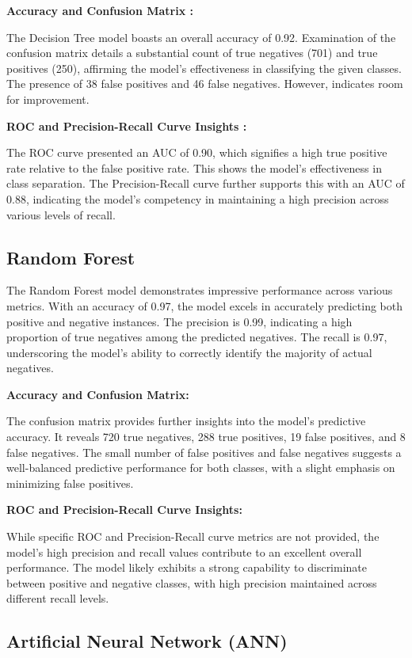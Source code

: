\documentclass[conference]{IEEEtran}
\begin{document}
\textbf{Accuracy and Confusion Matrix :}

The Decision Tree model boasts an overall accuracy of 0.92. Examination of the confusion matrix details a substantial count of true negatives (701) and true positives (250), affirming the model’s effectiveness in classifying the given classes. The presence of 38 false positives and 46 false negatives. However, indicates room for improvement.

\textbf{ROC and Precision-Recall Curve Insights :}

The ROC curve presented an AUC of 0.90, which signifies a high true positive rate relative to the false positive rate. This shows the model's effectiveness in class separation. The Precision-Recall curve further supports this with an AUC of 0.88, indicating the model's competency in maintaining a high precision across various levels of recall.

\subsection{\textbf{Random Forest}}

The Random Forest model demonstrates impressive performance across various metrics. With an accuracy of 0.97, the model excels in accurately predicting both positive and negative instances. The precision is 0.99, indicating a high proportion of true negatives among the predicted negatives. The recall is 0.97, underscoring the model's ability to correctly identify the majority of actual negatives.

\textbf{Accuracy and Confusion Matrix:}

The confusion matrix provides further insights into the model's predictive accuracy. It reveals 720 true negatives, 288 true positives, 19 false positives, and 8 false negatives. The small number of false positives and false negatives suggests a well-balanced predictive performance for both classes, with a slight emphasis on minimizing false positives.

\textbf{ROC and Precision-Recall Curve Insights:}

While specific ROC and Precision-Recall curve metrics are not provided, the model's high precision and recall values contribute to an excellent overall performance. The model likely exhibits a strong capability to discriminate between positive and negative classes, with high precision maintained across different recall levels.


\subsection{\textbf{Artificial Neural Network (ANN)}}
\end{document}

